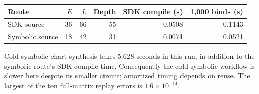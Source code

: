 \begin{center}\small\begin{tabular}{lrrrrr}\toprule
Route & $E$ & $L$ & Depth & SDK compile (s) & 1,000 binds (s)\\\midrule
SDK source & 36 & 66 & 55 & 0.0508 & 0.1143\\
Symbolic source & 18 & 42 & 31 & 0.0071 & 0.0521\\
\bottomrule\end{tabular}\end{center}
Cold symbolic chart synthesis takes 5.628 seconds in this run, in addition to the symbolic route's SDK compile time. Consequently the cold symbolic workflow is slower here despite its smaller circuit; amortized timing depends on reuse. The largest of the ten full-matrix replay errors is $1.6\times10^{-14}$.
